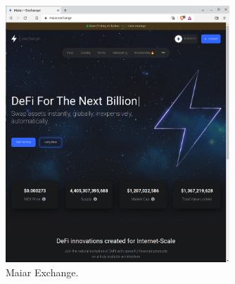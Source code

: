 \documentclass[11pt,a4paper]{article}
\begin{document}
\begin{figure}[h]
\includegraphics[width=0.75\textwidth]{maiardex.png}
\centering
\caption{Maiar Exchange.}\label{fig:maiardex}
\end{figure} 
\end{document}
